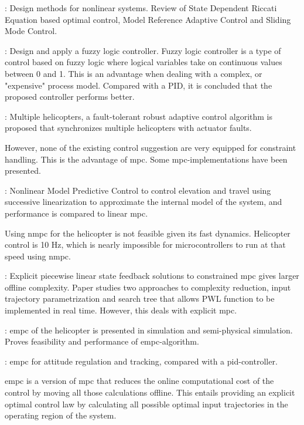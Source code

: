 \cite{kocagil_2017}: Design methods for nonlinear systems. Review of State Dependent Riccati Equation based optimal control, Model Reference Adaptive Control and Sliding Mode Control. 

\cite{jafri_2017}: Design and apply a fuzzy logic controller. Fuzzy logic controller is a type of control based on fuzzy logic where logical variables take on continuous values between 0 and 1. This is an advantage when dealing with a complex, or "expensive" process model. Compared with a PID, it is concluded that the proposed controller performs better.

\cite{yang_2019}: Multiple helicopters, a fault-tolerant robust adaptive control algorithm is proposed that synchronizes multiple helicopters with actuator faults.

However, none of the existing control suggestion are very equipped for constraint handling. This is the advantage of \acrshort{mpc}. Some \acrshort{mpc}-implementations have been presented.

\cite{Zhai2010}: Nonlinear Model Predictive Control to control elevation and travel using successive linearization to approximate the internal model of the system, and performance is compared to linear \acrshort{mpc}.

Using \acrshort{nmpc} for the helicopter is not feasible given its fast dynamics. Helicopter control is 10 Hz, which is nearly impossible for microcontrollers to run at that speed using \acrlong{nmpc}.

\cite{Tondel2002}: Explicit piecewise linear state feedback solutions to constrained \acrshort{mpc} gives larger offline complexity. Paper studies two approaches to complexity reduction, input trajectory parametrization and search tree that allows PWL function to be implemented in real time. However, this deals with explicit \acrshort{mpc}. 

\cite{ju_2014}: \acrfull{empc} of the helicopter is presented in simulation and semi-physical simulation. Proves feasibility and performance of \acrshort{empc}-algorithm. 

\cite{cheng_2016}: \acrfull{empc} for attitude regulation and tracking, compared with a \acrshort{pid}-controller. 


\acrfull{empc} is a version of \acrshort{mpc} that reduces the online computational cost of the control by moving all those calculations offline. This entails providing an explicit optimal control law  by calculating all possible optimal input trajectories in the operating region of the system. 

